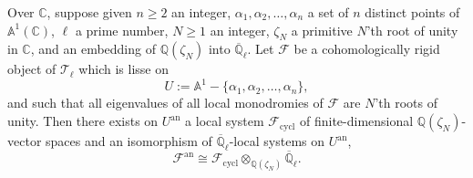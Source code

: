 Over \(\mathbb{C}\), suppose given \(n\geq 2\) an integer,
\(\alpha_1,\alpha_2,\ldots,\alpha_n\) a set of \(n\) distinct points of
\(\mathbb{A}^1(\mathbb{C})\), \(\ell\) a prime number, \(N\geq 1\) an integer,
\(\zeta_N\) a primitive \(N\)'th root of unity in \(\mathbb{C}\), and an
embedding of \(\mathbb{Q}(\zeta_N)\) into
\(\overline{\mathbb{Q}}_\ell\). Let \(\mathcal{F}\) be a cohomologically rigid
object of \(\mathcal{T}_\ell\) which is lisse on
\[
  U:=\mathbb{A}^1-\{\alpha_1,\alpha_2,\ldots,\alpha_n\},
\]
and such that all eigenvalues of all local monodromies of \(\mathcal{F}\) are
\(N\)'th roots of unity. Then there exists on \(U^{\mathrm{an}}\) a local
system \(\mathcal{F}_{\mathrm{cycl}}\) of finite-dimensional
\(\mathbb{Q}(\zeta_N)\)-vector spaces and an isomorphism of
\(\overline{\mathbb{Q}}_\ell\)-local systems on \(U^{\mathrm{an}}\),
\[
  \mathcal{F}^{\mathrm{an}}\cong
  \mathcal{F}_{\mathrm{cycl}}\otimes_{\mathbb{Q}(\zeta_N)}
  \overline{\mathbb{Q}}_\ell.
\]

